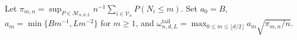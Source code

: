 Let \(\pi_{m,n}=\sup_{P\in\mathcal M_{n,d,L}}n^{-1}\sum_{i\in\mathcal V_n}P(N_i\le m)\). Set \(a_0=B\), \(a_m=\min\{Bm^{-1},Lm^{-2}\}\) for \(m\ge1\), and \(\omega^{\mathrm{tail}}_{n,d,L}=\max_{0\le m\le\lfloor d/2\rfloor}a_m\sqrt{\pi_{m,n}/n}\).